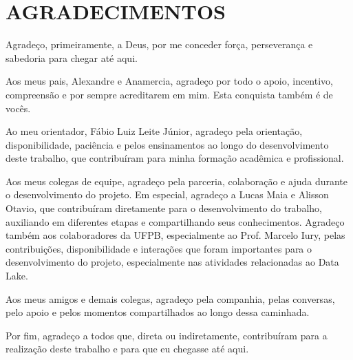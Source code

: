 
\thispagestyle{empty}
\section*{\normalsize \centering \textbf{AGRADECIMENTOS}}

Agradeço, primeiramente, a Deus, por me conceder força, perseverança e sabedoria para chegar até aqui.

Aos meus pais, Alexandre e Anamercia, agradeço por todo o apoio, incentivo, compreensão e por sempre 
acreditarem em mim. Esta conquista também é de vocês.

Ao meu orientador, Fábio Luiz Leite Júnior, agradeço pela orientação, disponibilidade, paciência e 
pelos ensinamentos ao longo do desenvolvimento deste trabalho, que contribuíram para minha formação 
acadêmica e profissional.

Aos meus colegas de equipe, agradeço pela parceria, colaboração e ajuda durante o desenvolvimento do 
projeto. Em especial, agradeço a Lucas Maia e Alisson Otavio, que contribuíram diretamente para o 
desenvolvimento do trabalho, auxiliando em diferentes etapas e compartilhando seus conhecimentos. 
Agradeço também aos colaboradores da UFPB, especialmente ao Prof. Marcelo Iury, pelas 
contribuições, disponibilidade e interações que foram importantes para o desenvolvimento do projeto, 
especialmente nas atividades relacionadas ao Data Lake.

Aos meus amigos e demais colegas, agradeço pela companhia, pelas conversas, pelo apoio e pelos momentos 
compartilhados ao longo dessa caminhada.

Por fim, agradeço a todos que, direta ou indiretamente, contribuíram para a realização deste trabalho 
e para que eu chegasse até aqui.

\newpage